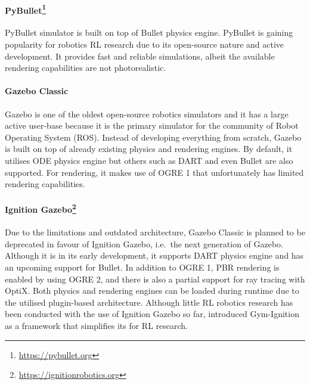 \paragraph{PyBullet\protect\footnote{\href{https://pybullet.org}{https://pybullet.org}}} PyBullet simulator is built on top of Bullet physics engine. PyBullet is gaining popularity for robotics RL research due to its open-source nature and active development. It provides fast and reliable simulations, albeit the available rendering capabilities are not photorealistic.

\paragraph{Gazebo Classic~\protect\cite{koenig_design_2004}} Gazebo is one of the oldest open-source robotics simulators and it has a large active user-base because it is the primary simulator for the community of Robot Operating System (ROS). Instead of developing everything from scratch, Gazebo is built on top of already existing physics and rendering engines. By default, it utilises ODE physics engine but others such as DART and even Bullet are also supported. For rendering, it makes use of OGRE 1 that unfortunately has limited rendering capabilities.

\paragraph{Ignition Gazebo\protect\footnote{\href{https://ignitionrobotics.org}{https://ignitionrobotics.org}}} Due to the limitations and outdated architecture, Gazebo Classic is planned to be deprecated in favour of Ignition Gazebo, i.e.~the next generation of Gazebo. Although it is in its early development, it supports DART physics engine and has an upcoming support for Bullet. In addition to OGRE 1, PBR rendering is enabled by using OGRE 2, and there is also a partial support for ray tracing with OptiX. Both physics and rendering engines can be loaded during runtime due to the utilised plugin-based architecture. Although little RL robotics research has been conducted with the use of Ignition Gazebo so far, \citet{ferigo_gym-ignition_2020} introduced Gym-Ignition as a framework that simplifies its for RL research.


